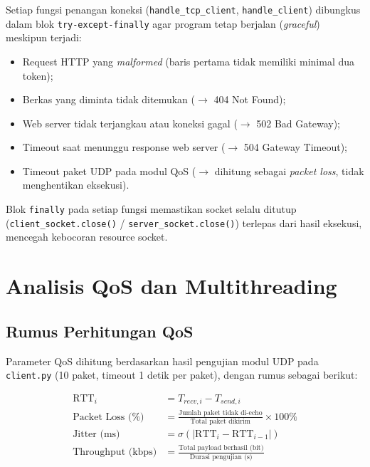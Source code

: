 \documentclass[11pt,a4paper]{article}
\begin{document}
Setiap fungsi penangan koneksi (\texttt{handle\_tcp\_client}, \texttt{handle\_client}) dibungkus dalam blok \texttt{try-except-finally} agar program tetap berjalan (\textit{graceful}) meskipun terjadi:
\begin{itemize}[noitemsep]
    \item Request HTTP yang \textit{malformed} (baris pertama tidak memiliki minimal dua token);
    \item Berkas yang diminta tidak ditemukan ($\rightarrow$ 404 Not Found);
    \item Web server tidak terjangkau atau koneksi gagal ($\rightarrow$ 502 Bad Gateway);
    \item Timeout saat menunggu response web server ($\rightarrow$ 504 Gateway Timeout);
    \item Timeout paket UDP pada modul QoS ($\rightarrow$ dihitung sebagai \textit{packet loss}, tidak menghentikan eksekusi).
\end{itemize}
Blok \texttt{finally} pada setiap fungsi memastikan socket selalu ditutup (\texttt{client\_socket.close()} / \texttt{server\_socket.close()}) terlepas dari hasil eksekusi, mencegah kebocoran resource socket.


\section{Analisis QoS dan Multithreading}

\subsection{Rumus Perhitungan QoS}
\label{subsec:rumus-qos}

Parameter QoS dihitung berdasarkan hasil pengujian modul UDP pada \texttt{client.py} (10 paket, timeout 1 detik per paket), dengan rumus sebagai berikut:

\begin{align}
\text{RTT}_i &= T_{recv,i} - T_{send,i} \\
\text{Packet Loss (\%)} &= \frac{\text{Jumlah paket tidak di-echo}}{\text{Total paket dikirim}} \times 100\% \\
\text{Jitter (ms)} &= \sigma\left(|\text{RTT}_i - \text{RTT}_{i-1}|\right) \\
\text{Throughput (kbps)} &= \frac{\text{Total payload berhasil (bit)}}{\text{Durasi pengujian (s)}}
\end{align}
\end{document}
